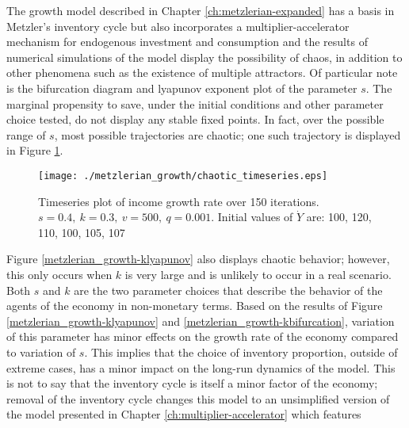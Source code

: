 The growth model described in Chapter \ref{ch:metzlerian-expanded} has a basis in Metzler's inventory cycle but also incorporates a multiplier-accelerator mechanism for endogenous investment and consumption and the results of numerical simulations of the model display the possibility of chaos, in addition to other phenomena such as the existence of multiple attractors. Of particular note is the bifurcation diagram and lyapunov exponent plot of the parameter $s$. The marginal propensity to save, under the initial conditions and other parameter choice tested, do not display any stable fixed points. In fact, over the possible range of $s$, most possible trajectories are chaotic; one such trajectory is displayed in Figure \ref{growth_chaotic-timeseries}.
\begin{figure}
    \centering
    \texttt{[image: ./metzlerian\_growth/chaotic\_timeseries.eps]}
    \caption{Timeseries plot of income growth rate over 150 iterations. $s=0.4,\ k=0.3,\ v=500,\ q=0.001$. Initial values of $\dot Y$ are: 100, 120, 110, 100, 105, 107}
    \label{growth_chaotic-timeseries}
\end{figure}
Figure \ref{metzlerian_growth-klyapunov} also displays chaotic behavior; however, this only occurs when $k$ is very large and is unlikely to occur in a real scenario. Both $s$ and $k$ are the two parameter choices that describe the behavior of the agents of the economy in non-monetary terms. Based on the results of Figure \ref{metzlerian_growth-klyapunov} and \ref{metzlerian_growth-kbifurcation}, variation of this parameter has minor effects on the growth rate of the economy compared to variation of $s$. This implies that the choice of inventory proportion, outside of extreme cases, has a minor impact on the long-run dynamics of the model. This is not to say that the inventory cycle is itself a minor factor of the economy; removal of the inventory cycle changes this model to an unsimplified version of the model presented in Chapter \ref{ch:multiplier-accelerator} which features 